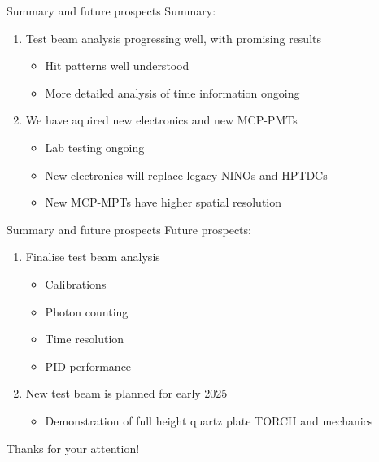 \documentclass[xcolor={dvipsnames}]{beamer}
\begin{document}
\begin{frame}{Summary and future prospects}
  \vspace{0.3cm}
  {\Large Summary:}
  \vspace{0.5cm}
  \begin{enumerate}
    \setlength\itemsep{1.5em}
    \item{Test beam analysis progressing well, with promising results}
    \begin{itemize}
      \item{Hit patterns well understood}
      \item{More detailed analysis of time information ongoing}
    \end{itemize}
    \item{We have aquired new electronics and new MCP-PMTs}
    \begin{itemize}
      \item{Lab testing ongoing}
      \item{New electronics will replace legacy NINOs and HPTDCs}
      \item{New MCP-MPTs have higher spatial resolution}
    \end{itemize}
  \end{enumerate}
\end{frame}

\begin{frame}{Summary and future prospects}
  \vspace{0.3cm}
  {\Large Future prospects:}
  \vspace{0.5cm}
  \begin{enumerate}
    \setlength\itemsep{1.5em}
    \item{Finalise test beam analysis}
    \begin{itemize}
      \item{Calibrations}
      \item{Photon counting}
      \item{Time resolution}
      \item{PID performance}
    \end{itemize}
    \item{New test beam is planned for early 2025}
    \begin{itemize}
      \item{Demonstration of full height quartz plate TORCH and mechanics}
    \end{itemize}
  \end{enumerate}
  \vspace{0.5cm}
  \begin{center}
    {\huge Thanks for your attention!}
  \end{center}
\end{frame}
\end{document}
